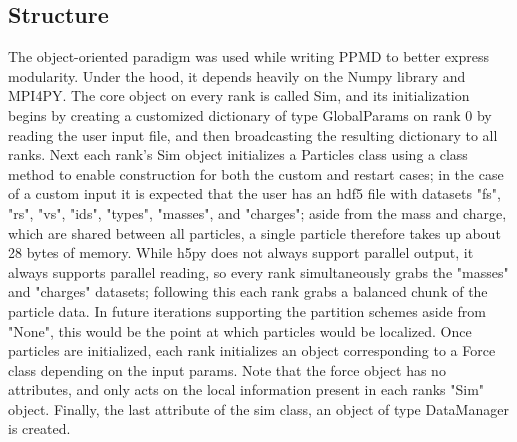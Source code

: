 \documentclass[%
 reprint,
 amsmath,amssymb,
 aps,
pra,
prb,
rmp,
prstab,
prstper,
]{revtex4-1}
\begin{document}
\subsection{\label{sec:level2}Structure}

The object-oriented paradigm was used while writing PPMD to better express
modularity. Under the hood, it depends heavily on the Numpy library\cite{numpy}
and MPI4PY. The core object on every rank is called Sim, and its 
initialization begins by creating a customized dictionary of type GlobalParams
on rank 0 by reading the user input file, and then broadcasting the resulting
dictionary to all ranks. Next each rank's Sim object initializes a Particles class
using a class method to enable construction for both the custom and restart cases;
in the case of a custom input it is expected that the user has an hdf5 file with
datasets "fs", "rs", "vs", "ids", "types", "masses", and "charges"; aside from
the mass and charge, which are shared between all particles, a single particle 
therefore takes up about 28 bytes of memory. While
h5py does not always support parallel output, it always supports parallel reading,
so every rank simultaneously grabs the "masses" and "charges" datasets; following this
each rank grabs a balanced chunk of the particle data. In future iterations supporting
the partition schemes aside from "None", this would be the point at which particles
would be localized. Once particles are initialized, each rank initializes an object
corresponding to a Force class depending on the input params. Note that the force
object has no attributes, and only acts on the local information present in each
ranks "Sim" object. Finally, the last attribute of the sim class, an object of 
type DataManager is created. 
\end{document}
